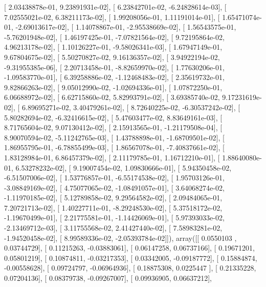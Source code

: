 \documentclass{article}
\begin{document}
       [  2.03438878e-01,   9.23891931e-02],
       [  6.23842701e-02,  -6.24828614e-03],
       [  7.02555021e-02,   6.38211173e-02],
       [  1.99208056e-01,   1.11191014e-01],
       [  1.65471074e-01,  -2.69013617e-02],
       [  1.14078867e-01,  -2.95538669e-02],
       [  1.56543575e-01,  -5.76201948e-02],
       [  1.46197425e-01,  -7.07821564e-02],
       [  9.72195864e-02,   4.96213178e-02],
       [  1.10126227e-01,  -9.58026341e-03],
       [  1.67947149e-01,   9.67804675e-02],
       [  5.50270827e-02,   9.16136357e-02],
       [  3.94922194e-02,  -9.31955385e-06],
       [  2.20713458e-01,  -8.82659970e-02],
       [  1.77630206e-01,  -1.09583770e-01],
       [  6.39258886e-02,  -1.12468483e-02],
       [  2.35619732e-01,   9.82866263e-02],
       [  9.05012990e-02,  -1.02694336e-01],
       [  1.07872250e-01,   6.06688972e-02],
       [  6.62715860e-02,   5.82993791e-02],
       [  3.69385740e-02,   9.17231619e-02],
       [  6.89695271e-02,   3.40479261e-02],
       [  8.72640225e-02,  -6.30537242e-02],
       [  5.80282694e-02,  -6.32416615e-02],
       [  5.47603477e-02,   8.83649161e-03],
       [  8.71765604e-02,   9.07130412e-02],
       [  2.15913565e-01,  -1.21179508e-04],
       [  8.90070594e-02,  -5.11242765e-03],
       [  1.43788898e-01,  -1.68709501e-02],
       [  1.86955795e-01,  -6.78855499e-03],
       [  1.86567078e-01,  -7.40837661e-02],
       [  1.83128984e-01,   6.86457379e-02],
       [  2.11179785e-01,   1.16712210e-01],
       [  1.88640080e-01,   6.53278232e-02],
       [  9.19007454e-02,   1.09830666e-01],
       [  5.94350458e-02,  -6.51507006e-02],
       [  1.53776857e-01,  -6.55174538e-02],
       [  1.95703126e-01,  -3.08849169e-02],
       [  4.75077065e-02,  -1.08491057e-01],
       [  3.64068274e-02,  -1.11970185e-02],
       [  5.12789858e-02,   9.29564582e-02],
       [  2.09484065e-01,   7.20721713e-02],
       [  1.40227711e-01,  -8.29248530e-02],
       [  5.37518172e-02,  -1.19670499e-01],
       [  2.21775581e-01,  -1.14426069e-01],
       [  5.97393033e-02,  -2.13469712e-03],
       [  3.11755568e-02,   2.41427440e-02],
       [  7.58983281e-02,  -1.94520458e-02],
       [  8.99589336e-02,  -2.05393784e-02]]), array([[ 0.0550103 ,  0.03744729],
       [ 0.11215263, -0.03883061],
       [ 0.06147258,  0.06737166],
       [ 0.19671201,  0.05801219],
       [ 0.10874811, -0.03217353],
       [ 0.03342005, -0.09187772],
       [ 0.15884874, -0.00558628],
       [ 0.09724797, -0.06964936],
       [ 0.18875308,  0.0225447 ],
       [ 0.21335228,  0.07204136],
       [ 0.08379738, -0.09267007],
       [ 0.09936905,  0.06637212],
\end{document}

